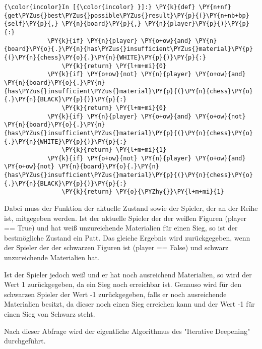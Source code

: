     \begin{Verbatim}[commandchars=\\\{\}]
{\color{incolor}In [{\color{incolor} }]:} \PY{k}{def} \PY{n+nf}{get\PYZus{}best\PYZus{}possible\PYZus{}result}\PY{p}{(}\PY{n+nb+bp}{self}\PY{p}{,} \PY{n}{board}\PY{p}{,} \PY{n}{player}\PY{p}{)}\PY{p}{:}
            \PY{k}{if} \PY{n}{player} \PY{o+ow}{and} \PY{n}{board}\PY{o}{.}\PY{n}{has\PYZus{}insufficient\PYZus{}material}\PY{p}{(}\PY{n}{chess}\PY{o}{.}\PY{n}{WHITE}\PY{p}{)}\PY{p}{:}
                \PY{k}{return} \PY{l+m+mi}{0}
            \PY{k}{if} \PY{o+ow}{not} \PY{n}{player} \PY{o+ow}{and} \PY{n}{board}\PY{o}{.}\PY{n}{has\PYZus{}insufficient\PYZus{}material}\PY{p}{(}\PY{n}{chess}\PY{o}{.}\PY{n}{BLACK}\PY{p}{)}\PY{p}{:}
                \PY{k}{return} \PY{l+m+mi}{0}
            \PY{k}{if} \PY{n}{player} \PY{o+ow}{and} \PY{o+ow}{not} \PY{n}{board}\PY{o}{.}\PY{n}{has\PYZus{}insufficient\PYZus{}material}\PY{p}{(}\PY{n}{chess}\PY{o}{.}\PY{n}{WHITE}\PY{p}{)}\PY{p}{:}
                \PY{k}{return} \PY{l+m+mi}{1}
            \PY{k}{if} \PY{o+ow}{not} \PY{n}{player} \PY{o+ow}{and} \PY{o+ow}{not} \PY{n}{board}\PY{o}{.}\PY{n}{has\PYZus{}insufficient\PYZus{}material}\PY{p}{(}\PY{n}{chess}\PY{o}{.}\PY{n}{BLACK}\PY{p}{)}\PY{p}{:}
                \PY{k}{return} \PY{o}{\PYZhy{}}\PY{l+m+mi}{1}
\end{Verbatim}

    Dabei muss der Funktion der aktuelle Zustand sowie der Spieler, der an
der Reihe ist, mitgegeben werden. Ist der aktuelle Spieler der der
weißen Figuren (player == True) und hat weiß unzureichende Materialien
für einen Sieg, so ist der bestmögliche Zustand ein Patt. Das gleiche
Ergebnis wird zurückgegeben, wenn der Spieler der der schwarzen Figuren
ist (player == False) und schwarz unzureichende Materialien hat.

Ist der Spieler jedoch weiß und er hat noch ausreichend Materialien, so
wird der Wert 1 zurückgegeben, da ein Sieg noch erreichbar ist. Genauso
wird für den schwarzen Spieler der Wert -1 zurückgegeben, falls er noch
ausreichende Materialien besitzt, da dieser noch einen Sieg erreichen
kann und der Wert -1 für einen Sieg von Schwarz steht.

Nach dieser Abfrage wird der eigentliche Algorithmus des "Iterative
Deepening" durchgeführt.

